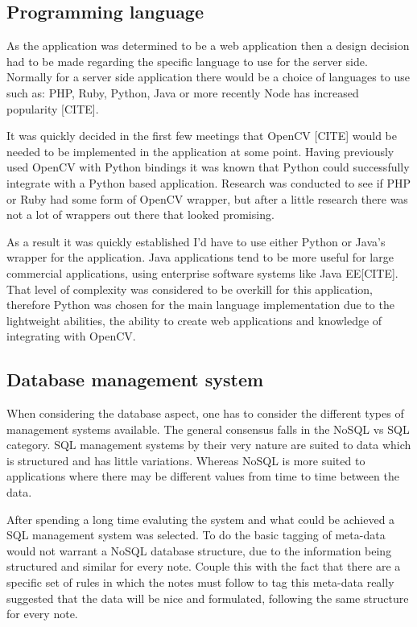 \subsection{Programming language}
As the application was determined to be a web application then a design decision had to be made regarding the specific language to use for the server side. Normally for a server side application there would be a choice of languages to use such as: PHP, Ruby, Python, Java or more recently Node has increased popularity [CITE].

It was quickly decided in the first few meetings that OpenCV [CITE] would be needed to be implemented in the application at some point. Having previously used OpenCV with Python bindings it was known that Python could successfully integrate with a Python based application. Research was conducted to see if PHP or Ruby had some form of OpenCV wrapper, but after a little research there was not a lot of wrappers out there that looked promising.

As a result it was quickly established I'd have to use either Python or Java's wrapper for the application. Java applications tend to be more useful for large commercial applications, using enterprise software systems like Java EE[CITE]. That level of complexity was considered to be overkill for this application, therefore Python was chosen for the main language implementation due to the lightweight abilities, the ability to create web applications and knowledge of integrating with OpenCV.
\subsection{Database management system}
When considering the database aspect, one has to consider the different types of management systems available. The general consensus falls in the NoSQL vs SQL category. SQL management systems by their very nature are suited to data which is structured and has little variations. Whereas NoSQL is more suited to applications where there may be different values from time to time between the data.

After spending a long time evaluting the system and what could be achieved a SQL management system was selected. To do the basic tagging of meta-data would not warrant a NoSQL database structure, due to the information being structured and similar for every note. Couple this with the fact that there are a specific set of rules in which the notes must follow to tag this meta-data really suggested that the data will be nice and formulated, following the same structure for every note.

